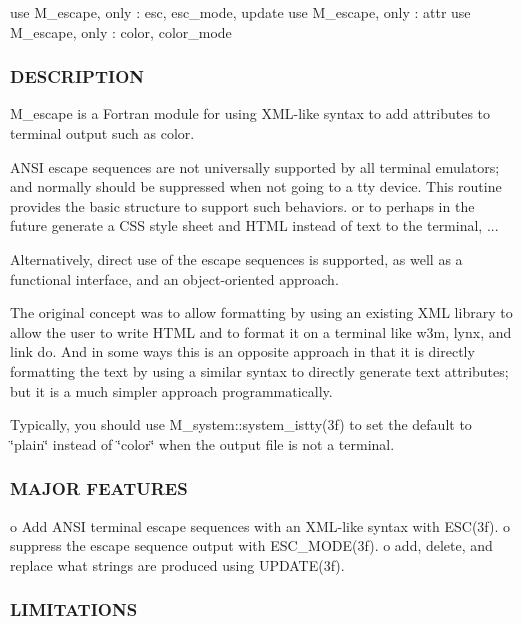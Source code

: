\begin{DoxyVerb} use M_escape, only : esc, esc_mode, update
 use M_escape, only : attr
 use M_escape, only : color, color_mode
\end{DoxyVerb}


\subsubsection*{D\+E\+S\+C\+R\+I\+P\+T\+I\+ON}

M\+\_\+escape is a Fortran module for using X\+M\+L-\/like syntax to add attributes to terminal output such as color.

A\+N\+SI escape sequences are not universally supported by all terminal emulators; and normally should be suppressed when not going to a tty device. This routine provides the basic structure to support such behaviors. or to perhaps in the future generate a C\+SS style sheet and H\+T\+ML instead of text to the terminal, ...

Alternatively, direct use of the escape sequences is supported, as well as a functional interface, and an object-\/oriented approach.

The original concept was to allow formatting by using an existing X\+ML library to allow the user to write H\+T\+ML and to format it on a terminal like w3m, lynx, and link do. And in some ways this is an opposite approach in that it is directly formatting the text by using a similar syntax to directly generate text attributes; but it is a much simpler approach programmatically.

Typically, you should use M\+\_\+system\+::system\+\_\+istty(3f) to set the default to \char`\"{}plain\char`\"{} instead of \char`\"{}color\char`\"{} when the output file is not a terminal.

\subsubsection*{M\+A\+J\+OR F\+E\+A\+T\+U\+R\+ES}

o Add A\+N\+SI terminal escape sequences with an X\+M\+L-\/like syntax with E\+S\+C(3f). o suppress the escape sequence output with E\+S\+C\+\_\+\+M\+O\+D\+E(3f). o add, delete, and replace what strings are produced using U\+P\+D\+A\+T\+E(3f).

\subsubsection*{L\+I\+M\+I\+T\+A\+T\+I\+O\+NS}

